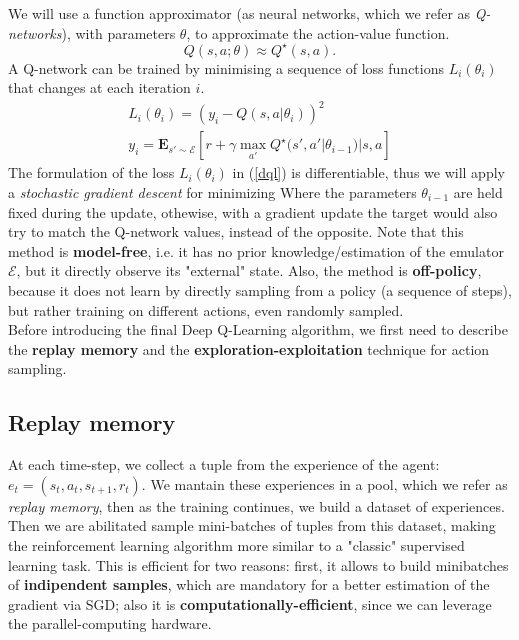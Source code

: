 \documentclass{article}
\begin{document}
We will use a function approximator (as neural networks, which we refer as \textit{Q-networks}), with parameters $\theta$, to approximate the action-value function.
\begin{equation}
	Q(s, a; \theta) \approx Q ^\star (s, a). 
\end{equation}
A Q-network can be trained by minimising a sequence of loss functions $L_i(\theta _i )$ that changes at each
iteration $i$.
\begin{equation}
\label{dql}
\begin{aligned}
	L_i(\theta _i ) = (y_i - Q(s,a|\theta_i))^2 \\
	y_i = \mathbf{E}_{s' \sim \mathcal{E}} [ r + \gamma \max_{a'} Q^\star(s', a'|\theta_{i-1}) | s, a  ]
\end{aligned}
\end{equation}
The formulation of the loss $L_i(\theta_i)$ in (\ref{dql}) is differentiable, thus we will apply a \textit{stochastic gradient descent} for minimizing 
Where the parameters $\theta_{i-1}$ are held fixed during the update, othewise, with a gradient update the target would also try to match the Q-network values, instead of the opposite. Note that this method is \textbf{model-free}, i.e. it has no prior knowledge/estimation of the emulator $\mathcal{E}$, but it directly observe its "external" state. Also, the method is \textbf{off-policy}, because it does not learn by directly sampling from a policy (a sequence of steps), but rather training on different actions, even randomly sampled.\\
Before introducing the final Deep Q-Learning algorithm, we first need to describe the \textbf{replay memory} and the \textbf{exploration-exploitation} technique for action sampling.
\subsection{Replay memory}
At each time-step, we collect a tuple from the experience of the agent: $e_t = (s_t, a_t, s_{t+1}, r_t)$. We mantain these experiences in a pool, which we refer as \textit{replay memory}, then as the training continues, we build a dataset of experiences. Then we are abilitated sample mini-batches of tuples from this dataset, making the reinforcement learning algorithm more similar to a "classic" supervised learning task. This is efficient for two reasons: first, it allows to build minibatches of \textbf{indipendent samples}, which are mandatory for a better estimation of the gradient via SGD; also it is \textbf{computationally-efficient}, since we can leverage the parallel-computing hardware.
\end{document}
